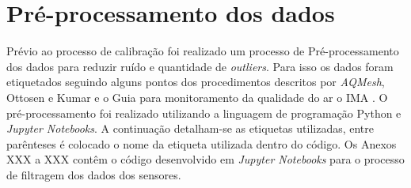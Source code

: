 \section{Pré-processamento dos dados}

Prévio ao processo de calibração foi realizado um processo de Pré-processamento dos dados para reduzir ruído e quantidade de \textit{outliers}. Para isso os dados foram etiquetados seguindo alguns pontos dos procedimentos descritos por \textit{AQMesh}, Ottosen e Kumar \cite{Ottosen2019OutlierMeasurements} e o Guia para monitoramento da qualidade do ar o IMA \cite*{INSTITUTODEENERGIAEMEIOAMBIENTE2019QualidadeAr}. O pré-processamento foi realizado utilizando a linguagem de programação Python e \textit{Jupyter Notebooks}. A continuação detalham-se as etiquetas utilizadas, entre parênteses é colocado o nome da etiqueta utilizada dentro do código. Os Anexos XXX a XXX contêm o código desenvolvido em \textit{Jupyter Notebooks} para o processo de filtragem dos dados dos sensores.

